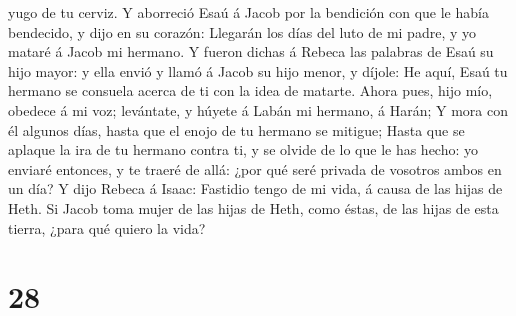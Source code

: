 yugo de tu cerviz.  Y aborreció Esaú á Jacob por la
bendición con que le había bendecido, y dijo en su corazón: Llegarán los
días del luto de mi padre, y yo mataré á Jacob mi hermano.
 Y fueron dichas á Rebeca las palabras de Esaú su hijo
mayor: y ella envió y llamó á Jacob su hijo menor, y díjole: He aquí,
Esaú tu hermano se consuela acerca de ti con la idea de matarte.
 Ahora pues, hijo mío, obedece á mi voz; levántate, y
húyete á Labán mi hermano, á Harán;  Y mora con él
algunos días, hasta que el enojo de tu hermano se mitigue;
 Hasta que se aplaque la ira de tu hermano contra ti, y
se olvide de lo que le has hecho: yo enviaré entonces, y te traeré de
allá: ¿por qué seré privada de vosotros ambos en un día? 
Y dijo Rebeca á Isaac: Fastidio tengo de mi vida, á causa de las hijas
de Heth. Si Jacob toma mujer de las hijas de Heth, como éstas, de las
hijas de esta tierra, ¿para qué quiero la vida?

\hypertarget{section-27}{%
\section{28}\label{section-27}}

